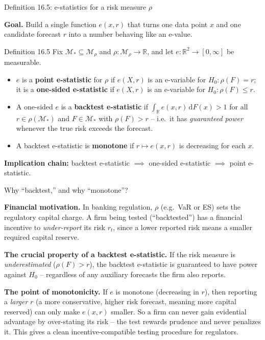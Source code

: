 \documentclass[aspectratio=169,10pt]{beamer}
\newcommand{\RR}{\mathbb{R}}
\newcommand{\1}{\mathbb{1}}
\begin{document}
\begin{frame}{Definition 16.5: e-statistics for a risk measure $\rho$}

\textbf{Goal.} Build a single function $e(x,r)$ that turns one data point $x$ and one candidate forecast $r$ into a number behaving like an e-value.

\begin{block}{Definition 16.5}
Fix $\mathcal M_* \subseteq \mathcal M_\rho$ and $\rho: \mathcal M_\rho \to \RR$, and let $e: \RR^2 \to [0,\infty]$ be measurable.
\begin{itemize}
\item[(i)] $e$ is a \textbf{point e-statistic} for $\rho$ if $e(X,r)$ is an e-variable for $H_0: \rho(F)=r$; it is a \textbf{one-sided e-statistic} if $e(X,r)$ is an e-variable for $H_0: \rho(F) \le r$.
\item[(ii)] A one-sided $e$ is a \textbf{backtest e-statistic} if $\int_{\RR} e(x,r)\,\mathrm dF(x) > 1$ for all $r \in \rho(\mathcal M_*)$ and $F \in \mathcal M_*$ with $\rho(F) > r$ -- i.e.\ it has \emph{guaranteed power} whenever the true risk exceeds the forecast.
\item[(iii)] A backtest e-statistic is \textbf{monotone} if $r \mapsto e(x,r)$ is decreasing for each $x$.
\end{itemize}
\end{block}

\textbf{Implication chain:} backtest e-statistic $\implies$ one-sided e-statistic $\implies$ point e-statistic.

\end{frame}

\begin{frame}{Why ``backtest,'' and why ``monotone''?}

\textbf{Financial motivation.} In banking regulation, $\rho$ (e.g.\ VaR or ES) sets the regulatory capital charge. A firm being tested (``backtested'') has a financial incentive to \emph{under-report} its risk $r_t$, since a lower reported risk means a smaller required capital reserve.

\vspace{2mm}
\textbf{The crucial property of a backtest e-statistic.} If the risk measure is \emph{underestimated} ($\rho(F) > r$), the backtest e-statistic is guaranteed to have power against $H_0$ -- regardless of any auxiliary forecasts the firm also reports.

\vspace{2mm}
\textbf{The point of monotonicity.} If $e$ is monotone (decreasing in $r$), then reporting a \emph{larger} $r$ (a more conservative, higher risk forecast, meaning more capital reserved) can only make $e(x,r)$ smaller. So a firm can never gain evidential advantage by over-stating its risk -- the test rewards prudence and never penalizes it. This gives a clean incentive-compatible testing procedure for regulators.

\end{frame}
\end{document}
